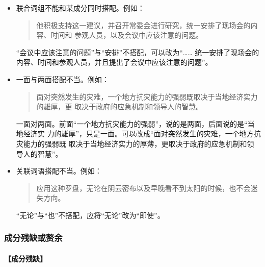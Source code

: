 \documentclass[final,oneside]{ctexbook}
\newenvironment{equotation}{\begin{quotation}\kaishu}{\end{quotation}}
\begin{document}
\begin{itemize}
    “它的审美情趣和艺术品位”，“是”，“奇葩”，分句间的主宾搭配不当。可以改成“京剧
    是中国独有的表演艺术，极具审美情趣和艺术品位，是中国文化的形象代言之一，是
    世界艺术之林的奇葩”。

  \item 联合词组不能和某成分同时搭配。例如：

    \begin{equotation}
      他积极支持这一建议，并召开常委会进行研究，统一安排了现场会的内容、时间和
      参观人员，以及会议中应该注意的问题。
    \end{equotation}

    “会议中应该注意的问题”与“安排”不搭配，可以改为“……
    统一安排了现场会的内容、时间和参观人员，并且提出了会议中应该注意的问题”。

  \item 一面与两面搭配不当。例如：

    \begin{equotation}
      面对突然发生的灾难，一个地方抗灾能力的强弱既取决于当地经济实力的雄厚，更
      取决于政府的应急机制和领导人的智慧。
    \end{equotation}

    一面对两面。前面“一个地方抗灾能力的强弱”，说的是两面，后面说的是“当地经济实
    力的雄厚”，只是一面。可以改成“面对突然发生的灾难，一个地方抗灾能力的强弱既
    取决于当地经济实力的厚薄，更取决于政府的应急机制和领导人的智慧”。

  \item 关联词语搭配不当。例如：

    \begin{equotation}
      应用这种罗盘，无论在阴云密布以及早晚看不到太阳的时候，也不会迷失方向。
    \end{equotation}

    “无论”与“也”不搭配，应将“无论”改为“即使”。

\end{itemize}

\subsubsection{成分残缺或赘余}

\paragraph{【成分残缺】}
\end{document}
